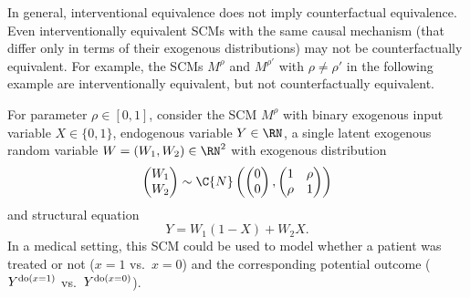 In general, interventional equivalence does not imply counterfactual equivalence. Even interventionally equivalent SCMs with the same causal mechanism (that differ only in terms of their exogenous distributions) may not be counterfactually equivalent. For example, the SCMs $M^{\rho}$ and $M^{\rho'}$ with $\rho\neq\rho'$ in the following example are interventionally equivalent, but not counterfactually equivalent.
\begin{Eg}\label{ex:Counterfactuals}
  For parameter $\rho\in[0,1]$, consider the SCM $M^\rho$ with binary exogenous input variable $X \in \{0,1\}$, endogenous variable $Y \in \RN$, a single latent exogenous random variable $W = (W_1,W_2) \in \RN^2$ with
exogenous distribution 
  $$\begin{pmatrix} W_1 \\ W_2 \end{pmatrix}\sim\C{N}\left(\begin{pmatrix}0 \\ 0\end{pmatrix},\begin{pmatrix}1&\rho\\ \rho&1\end{pmatrix}\right)$$
and structural equation
  $$Y = W_1 (1 - X) + W_2 X.$$
In a medical setting, this SCM could be used to model whether a patient was treated or not ($x=1$ vs.\ $x=0$) and the corresponding potential outcome ($Y^{\operatorname{do}(x=1)}$ vs.\ $Y^{\operatorname{do}(x=0)}$).


\end{Eg}
